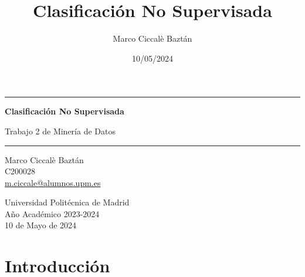 \documentclass{article}
\title{Clasificación No Supervisada}
\author{Marco Ciccalè Baztán}
\date{10/05/2024}
\begin{document}
\begin{titlepage}
    \centering

    \vspace*{1cm}

    \rule{\textwidth}{1pt}

    \vspace{.7\baselineskip}
    {\huge \textbf{Clasificación No Supervisada}}

    \vspace*{.5cm}
    {\LARGE Trabajo 2 de Minería de Datos}
    
    \rule{\textwidth}{1pt}

    \vspace{1cm}

    \large

    \centering
        Marco Ciccalè Baztán \\
        \textsc{C200028} \\
        {\normalsize \url{m.ciccale@alumnos.upm.es}}


    \vspace{3cm}

    \vfill

    Universidad Politécnica de Madrid \\
    Año Académico 2023-2024 \\
    10 de Mayo de 2024
\end{titlepage}

\newpage

\tableofcontents

\newpage

\section{Introducción}


\end{document}
